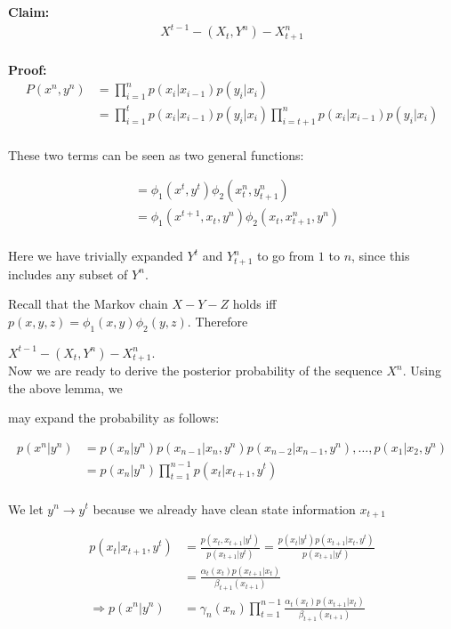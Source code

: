 \documentclass{article}
\begin{document}
	\textbf{Claim:} 
	\begin{align*}
		X^{t-1} - (X_t, Y^n) - X^{n}_{t+1}\\
	\end{align*}
	
	\textbf{Proof:} 
	\begin{align*}
		P(x^n,y^n) &= \prod_{i=1}^{n}p(x_i | x_{i-1})p(y_i | x_i)\\
		&= \prod_{i=1}^{t}p(x_i | x_{i-1})p(y_i | x_i) \prod_{i = t+1}^{n}p(x_i | x_{i-1})p(y_i | x_i)\\
	\end{align*}
	
	These two terms can be seen as two general functions:
	
	\begin{align*}
		&= \phi_1(x^t, y^t)\phi_2(x_{t}^{n}, y_{t+1}^{n})\\
		&= \phi_1(x^{t+1}, x_t, y^n) \phi_2(x_t, x_{t+1}^{n}, y^n)\\
	\end{align*}
	
	Here we have trivially expanded $Y^t$ and $Y_{t+1}^n$ to go from $1$ to $n$, since this includes any subset of $Y^n$.  
	
	Recall that the Markov chain $X - Y - Z$ holds iff $p(x,y,z)=\phi_1(x,y)\phi_2(y,z)$. Therefore 
	
	$X^{t-1} - (X_t, Y^n) - X^{n}_{t+1}$.\\
	
	Now we are ready to derive the posterior probability of the sequence $X^n$. Using the above lemma, we 
	
	may expand the probability as follows:
	
	\begin{align*}
		p(x^n | y^n) &= p(x_n | y^n) p(x_{n-1} | x_n, y^n)p(x_{n-2} | x_{n-1}, y^n),\dots, p(x_1 | x_2, y^n)\\
		&= p(x_n | y^n) \prod_{t=1}^{n-1}p(x_t | x_{t+1}, y^t)\\
	\end{align*}
	
	We let $y^n \rightarrow y^t$ because we already have clean state information $x_{t+1}$
	
	\begin{align*}
		p(x_t | x_{t+1}, y^t) &= \frac{p(x_t , x_{t+1} | y^t)}{p(x_{t+1} | y^t)} = \frac{p(x_t | y^t) p(x_{t+1} | x_t , y^t)}{p(x_{t+1} | y^t)}\\
		&= \frac{\alpha_t (x_t) p(x_{t+1} | x_t)}{\beta_{t+1}(x_{t+1})}\\
		\Rightarrow p(x^n | y^n) &= \gamma_n (x_n) \prod_{t=1}^{n-1} \frac{\alpha_t (x_t) p(x_{t+1} | x_t)}{\beta_{t+1} (x_{t+1})}\\
	\end{align*}
	
\end{document}
